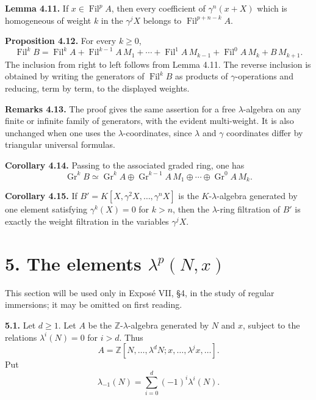 \documentclass[11pt]{article}
\newcommand{\Gr}{\operatorname{Gr}}
\newcommand{\Fil}{\operatorname{Fil}}
\providecommand{\Gr}{\operatorname{Gr}}
\providecommand{\Gr}{\operatorname{G}}
\begin{document}
\textbf{Lemma 4.11.} If \(x\in\Fil^pA\), then every coefficient of \(\gamma^n(x+X)\) which is homogeneous of weight \(k\) in the \(\gamma^jX\) belongs to \(\Fil^{p+n-k}A\).

\textbf{Proposition 4.12.} For every \(k\ge0\),
\begin{equation}\tag{4.12.1}
  \Fil^kB=
  \Fil^kA+\Fil^{k-1}A\,M_1+\cdots+\Fil^1A\,M_{k-1}
  +\Fil^0A\,M_k+B\,M_{k+1}.
\end{equation}
The inclusion from right to left follows from Lemma 4.11. The reverse inclusion is obtained by writing the generators of \(\Fil^kB\) as products of \(\gamma\)-operations and reducing, term by term, to the displayed weights.

\textbf{Remarks 4.13.} The proof gives the same assertion for a free \(\lambda\)-algebra on any finite or infinite family of generators, with the evident multi-weight. It is also unchanged when one uses the \(\lambda\)-coordinates, since \(\lambda\) and \(\gamma\) coordinates differ by triangular universal formulas.

\textbf{Corollary 4.14.} Passing to the associated graded ring, one has
\begin{equation}\tag{4.14.1}
  \Gr^kB\simeq
  \Gr^kA\oplus \Gr^{k-1}A\,M_1\oplus\cdots\oplus\Gr^0A\,M_k.
\end{equation}

\textbf{Corollary 4.15.} If \(B'=K[X,\gamma^2X,\ldots,\gamma^nX]\) is the \(K\)-\(\lambda\)-algebra generated by one element satisfying \(\gamma^k(X)=0\) for \(k>n\), then the \(\lambda\)-ring filtration of \(B'\) is exactly the weight filtration in the variables \(\gamma^jX\).

\section*{5. The elements \(\lambda^p(N,x)\)}

This section will be used only in Exposé VII, §4, in the study of regular immersions; it may be omitted on first reading.

\textbf{5.1.} Let \(d\ge1\). Let \(A\) be the \(\mathbb Z\)-\(\lambda\)-algebra generated by \(N\) and \(x\), subject to the relations \(\lambda^i(N)=0\) for \(i>d\). Thus
\[
  A=\mathbb Z[N,\ldots,\lambda^dN;
       x,\ldots,\lambda^jx,\ldots].
\]
Put
\begin{equation}\tag{5.1.1}
  \lambda_{-1}(N)=\sum_{i=0}^{d}(-1)^i\lambda^i(N).
\end{equation}
\end{document}
